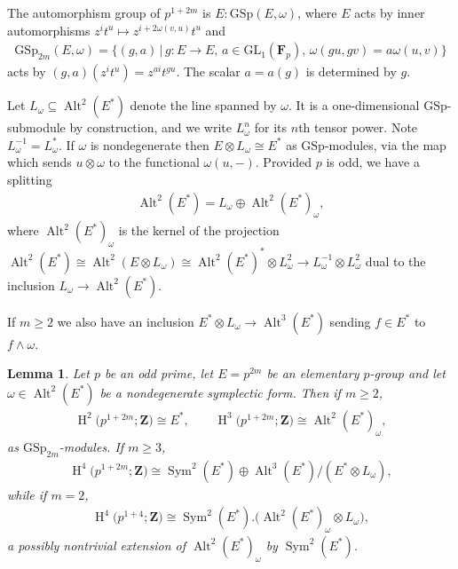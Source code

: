 \documentclass[pdftex]{sigma}
\numberwithin{equation}{section}
\newtheorem{Lemma}[Theorem]{Lemma}
\newcommand\bF{\mathbf F}
\newcommand\bZ{\mathbf Z}
\DeclareMathOperator\homology{H}
\renewcommand\H{\homology}
\newcommand\<\langle
\renewcommand\>\rangle
\DeclareMathOperator\Sym{Sym}
\DeclareMathOperator\Alt{Alt}
\newcommand{\GL}{\mathrm{GL}}
\begin{document}
The automorphism group of $p^{1+2m}$ is $E:\mathrm{GSp}(E,\omega)$, where $E$ acts by inner automorphisms $z^i t^u \mapsto z^{i+2\omega(v,u)} t^u$ and{\samepage
\begin{gather*}
\mathrm{GSp}_{2m}(E,\omega) = \{(g,a) \,|\, g\colon E \to E,\, a \in \GL_1(\bF_p),\, \omega(gu,gv) = a\omega(u,v)\}
\end{gather*}
acts by $(g,a) (z^i t^u) = z^{ai} t^{gu}$. The scalar $a = a(g)$ is determined by $g$.}

Let $L_\omega \subseteq \Alt^2(E^*)$ denote the line spanned by $\omega$. It is a one-dimensional $\mathrm{GSp}$-submodule by construction, and we write $L_{\omega}^n$ for its $n$th tensor power. Note $L_{\omega}^{-1} = L_{\omega}^*$. If $\omega$ is nondegenerate then $E \otimes L_\omega \cong E^*$ as $\mathrm{GSp}$-modules, via the map which sends $u \otimes \omega$ to the functional $\omega(u,-)$. Provided $p$ is odd, we have a splitting
\begin{gather*}
\Alt^2(E^*) = L_{\omega} \oplus \Alt^2(E^*)_{\omega},
\end{gather*}
where $\Alt^2(E^*)_{\omega}$ is the kernel of the projection $\Alt^2(E^*) \cong \Alt^2(E \otimes L_{\omega}) \cong \Alt^2(E^*)^* \otimes L_{\omega}^{2} \to L_{\omega}^{-1} \otimes L_{\omega}^2$ dual to the inclusion $L_{\omega} \to \Alt^2(E^*)$.

If $m \geq 2$ we also have an inclusion $E^* \otimes L_{\omega} \to \Alt^3(E^*)$ sending $f \in E^*$ to $f \wedge \omega$.

\begin{Lemma}\label{lem:extraspecial-odd}
Let $p$ be an odd prime, let $E = p^{2m}$ be an elementary $p$-group and let $\omega \in \Alt^2(E^*)$ be a nondegenerate symplectic form. Then if $m \geq 2$,
\begin{gather*}
\H^2\big(p^{1+2m};\bZ\big) \cong E^*, \qquad \H^3\big(p^{1+2m};\bZ\big) \cong \Alt^2(E^*)_\omega,
\end{gather*}
as $\mathrm{GSp}_{2m}$-modules. If $m \geq 3$,
\begin{gather*}
\H^4\big(p^{1+2m};\bZ\big) \cong \Sym^2(E^*) \oplus \Alt^3(E^*)/(E^* \otimes L_{\omega}) ,
\end{gather*}
while if $m = 2$,
\begin{gather*}
\H^4\big(p^{1+4};\bZ\big) \cong \Sym^2(E^*).\big(\Alt^2(E^*)_{\omega} \otimes L_{\omega}\big),
\end{gather*}
a possibly nontrivial extension of $\Alt^2(E^*)_{\omega}$ by $\Sym^2(E^*)$.
\end{Lemma}
\end{document}
